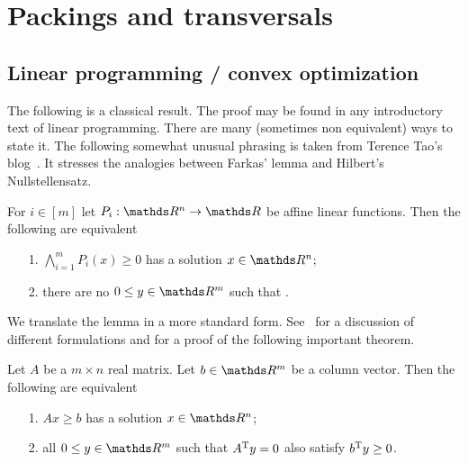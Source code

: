 \documentclass[sputnik.tex]{subfiles}
\begin{document}
\def\Fr{\mathop{\rm Fr}}

\def\vc{{\footnotesize VC}}
\def\nip{{\footnotesize NIP}}


\def\medrel#1{\parbox[t]{6ex}{$\displaystyle\hfil #1$}}
\def\ceq#1#2#3{\parbox[t]{15ex}{$\displaystyle #1$}\medrel{#2}{$\displaystyle #3$}}



\chapter{Packings and transversals}



\section{Linear programming / convex optimization}\label{LP}

The following is a classical result.
The proof may be found in any introductory text of linear programming.
There are many (sometimes non equivalent) ways to state it.
The following somewhat unusual phrasing is taken from Terence Tao's blog~\cite{Tao}.
It stresses the analogies between Farkas' lemma and Hilbert's Nullstellensatz.

\begin{proposition}
For $i\in[m]$ let $P_i:\RR^n\to\RR$ be affine linear functions.
Then the following are equivalent
\nobreak  
\begin{itemize}
\item[1.] $\displaystyle\bigwedge^m_{i=1}P_i(x)\ge 0$ has a solution $x\in\RR^n$;
\item[2.] there are no $0\le y\in\RR^m$ such that .\QED
\end{itemize}
\end{proposition}

We translate the lemma in a more standard form. See~\cite{GM} for a discussion of different formulations and for a proof of the following important theorem.

\begin{proposition}
Let $A$ be a $m\times n$ real matrix. 
Let $b\in\RR^m$ be a column vector.
Then the following are equivalent
\nobreak  
\begin{itemize}
\item[1.] $Ax\ge b$ has a solution $x\in\RR^n$;
\item[2.] all $0\le y\in\RR^m$ such that $A^{\rm T}y=0$ also satisfy $b^{\rm T}y\ge0$.\QED
\end{itemize}
\end{proposition}
\end{document}
